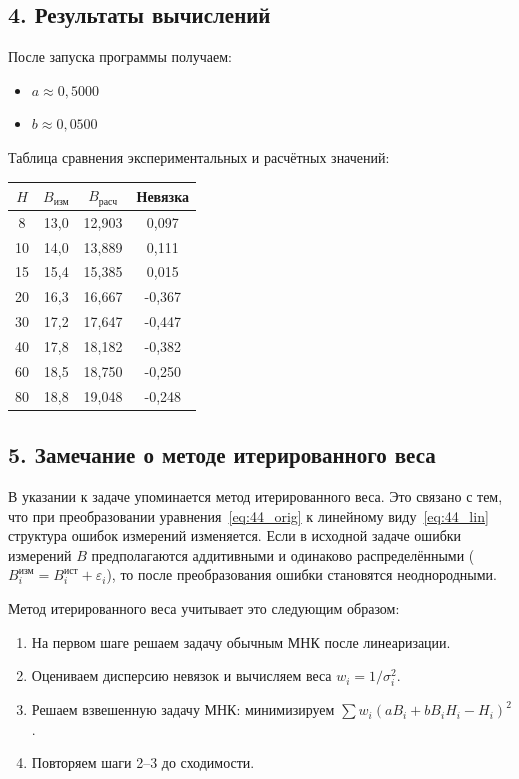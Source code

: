 \documentclass{article}
\begin{document}
\subsection*{4. Результаты вычислений}

После запуска программы получаем:
\begin{itemize}
\item $a \approx 0{,}5000$
\item $b \approx 0{,}0500$
\end{itemize}

Таблица сравнения экспериментальных и расчётных значений:

\begin{center}
\begin{tabular}{|c|c|c|c|}
\hline
$H$ & $B_{\text{изм}}$ & $B_{\text{расч}}$ & Невязка \\
\hline
8 & 13,0 & 12,903 & 0,097 \\
10 & 14,0 & 13,889 & 0,111 \\
15 & 15,4 & 15,385 & 0,015 \\
20 & 16,3 & 16,667 & -0,367 \\
30 & 17,2 & 17,647 & -0,447 \\
40 & 17,8 & 18,182 & -0,382 \\
60 & 18,5 & 18,750 & -0,250 \\
80 & 18,8 & 19,048 & -0,248 \\
\hline
\end{tabular}
\end{center}

\subsection*{5. Замечание о методе итерированного веса}

В указании к задаче упоминается метод итерированного веса. Это связано с тем, что при преобразовании уравнения~\eqref{eq:44_orig} к линейному виду~\eqref{eq:44_lin} структура ошибок измерений изменяется. Если в исходной задаче ошибки измерений $B$ предполагаются аддитивными и одинаково распределёнными ($B_i^{\text{изм}} = B_i^{\text{ист}} + \varepsilon_i$), то после преобразования ошибки становятся неоднородными.

Метод итерированного веса учитывает это следующим образом:
\begin{enumerate}
\item На первом шаге решаем задачу обычным МНК после линеаризации.
\item Оцениваем дисперсию невязок и вычисляем веса $w_i = 1/\sigma_i^2$.
\item Решаем взвешенную задачу МНК: минимизируем $\sum w_i (a B_i + b B_i H_i - H_i)^2$.
\item Повторяем шаги 2--3 до сходимости.
\end{enumerate}
\end{document}
